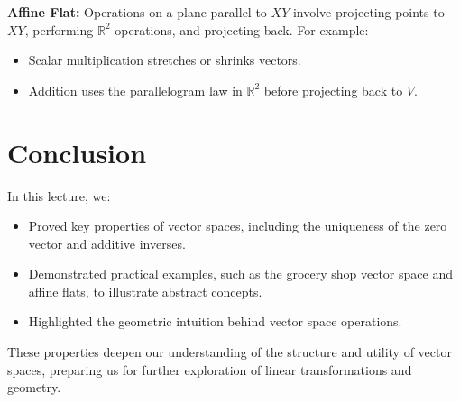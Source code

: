 \documentclass{article}
\begin{document}
\textbf{Affine Flat:}
Operations on a plane parallel to $XY$ involve projecting points to $XY$, performing $\mathbb{R}^2$ operations, and projecting back. For example:
\begin{itemize}
  \item Scalar multiplication stretches or shrinks vectors.
  \item Addition uses the parallelogram law in $\mathbb{R}^2$ before projecting back to $V$.
\end{itemize}

\section*{Conclusion}

In this lecture, we:
\begin{itemize}
  \item Proved key properties of vector spaces, including the uniqueness of the zero vector and additive inverses.
  \item Demonstrated practical examples, such as the grocery shop vector space and affine flats, to illustrate abstract concepts.
  \item Highlighted the geometric intuition behind vector space operations.
\end{itemize}

These properties deepen our understanding of the structure and utility of vector spaces, preparing us for further exploration of linear transformations and geometry.
\end{document}
